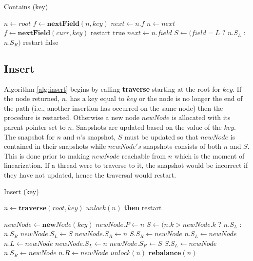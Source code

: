 \documentclass[conference]{IEEEtran}
\theoremstyle{definition}
\theoremstyle{theorem}
\renewcommand{\O}{\,||\,}
\newcommand{\A}{\,\&\&\,}
\begin{document}
\begin{algorithm}[t]
\caption{Contains (key)}
\label{alg:contains}
\begin{algorithmic}[1]
\State $n\gets root$
\State $f \gets \mathbf{nextField}(n, key)$
\State $next \gets n.f$
  \State $n\gets next$
  \State $f \gets \mathbf{nextField}(curr, key)$
  	 \label{alg:contains:lock}
  		\State restart
  	\EndIf
  	\State \Return true
	\EndIf
	\State $next \gets n.field$
\EndWhile
\State $S \gets (field = L$ ? $n.S_L$ : $n.S_R)$
 \label{alg:contains:snap}
\State restart
\EndIf
\State \Return false
\end{algorithmic}
\end{algorithm}

\subsection{Insert}
Algorithm \ref{alg:insert} begins by calling \textbf{traverse} starting at the root for $key$. If the node returned, $n$, has a key equal to $key$ or the node is no longer the end of the path (i.e., another insertion has occurred on the same node) then the procedure is restarted. Otherwise a new node $newNode$ is allocated with its parent pointer set to $n$. Snapshots are updated based on the value of the $key$. The snapshot for $n$ and $n$'s snapshot, $S$ must be updated so that $newNode$ is contained in their snapshots while $newNode's$ snapshots consists of both $n$ and $S$. This is done prior to making $newNode$ reachable from $n$ which is the moment of linearization. If a thread were to traverse to it, the snapshot would be incorrect if they have not updated, hence the traversal would restart.

\begin{algorithm}[t]
\caption{Insert (key)}
\label{alg:insert}
\begin{algorithmic}[1]
\State $n\gets \mathbf{traverse}(root, key)$
\State \Return
\ElsIf {($key>n.k \A n.R \neq null)$ \\
$\O (key<n.k \A n.L \neq null$)}
	\State $unlock(n)$ \textbf{then} restart
\EndIf

\State $newNode\gets \mathbf{new} Node(key)$
\State $newNode.P \gets n$
\State $S \gets (n.k > newNode.k$ ? $n.S_L$ : $n.S_R$
\label{alg:insert:snaps}
	\State $newNode.S_L \gets S$
	\State $newNode.S_R \gets n$
	\State $S.S_R \gets newNode$
	\State $n.S_L \gets newNode$
	\State $n.L \gets newNode$
\Else
	\State $newNode.S_L \gets n$
	\State $newNode.S_R \gets S$
	\State $S.S_L \gets newNode$
	\State $n.S_R \gets newNode$
	\State $n.R \gets newNode$
\EndIf
\State $unlock(n)$
 $\mathbf{rebalance}(n)$
\EndIf
\end{algorithmic}
\end{algorithm}
\end{document}
